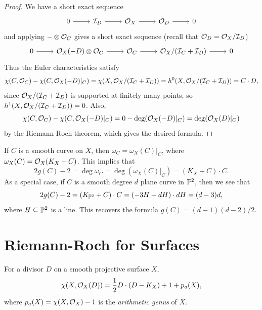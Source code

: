 \begin{proof}
  We have a short exact sequence
  \[
    \begin{tikzcd}
      0 \ar[r] & \mathcal{I}_D
      \ar[r] & \OO_X
      \ar[r] & \OO_D
      \ar[r] & 0
    \end{tikzcd}
  \]
  and applying $- \otimes \mathcal{O}_C$ gives a
  short exact sequence
  (recall that $\mathcal{O}_D = \mathcal{O}_X / \mathcal{I}_D$)
  \[
    \begin{tikzcd}
      0 \ar[r] &
      \OO_X(-D) \otimes \OO_C
      \ar[r] & \OO_C
      \ar[r] & \OO_X / (\mathcal{I}_C + \mathcal{I}_D)
      \ar[r] & 0
    \end{tikzcd}
  \]
  Thus the Euler characteristics satisfy
  \[
    \chi(C, \mathcal{O}_C)
    - \chi(C, \mathcal{O}_X(-D)|_C)
    = \chi(X, \mathcal{O}_X / (\mathcal{I}_C + \mathcal{I}_D))
    = h^0(X, \mathcal{O}_X / (\mathcal{I}_C + \mathcal{I}_D))
    = C \cdot D,
  \]
  since $\mathcal{O}_X / (\mathcal{I}_C + \mathcal{I}_D)$ is supported at finitely many points,
  so $h^1(X, \mathcal{O}_X / (\mathcal{I}_C + \mathcal{I}_D)) = 0$.
  Also,
  \[
    \chi(C, \mathcal{O}_C)
    - \chi(C, \mathcal{O}_X(-D)|_C)
    = 0 - \deg(\mathcal{O}_X(-D)|_C)
    = \deg(\mathcal{O}_X(D)|_C)
  \]
  by the Riemann-Roch theorem, which
  gives the desired formula.
\end{proof}

\begin{example}
  If $C$ is a smooth curve on $X$, then
  $\omega_C
    = \omega_X(C)|_C$, where
  $\omega_X(C) = \mathcal{O}_X(K_X + C)$.
  This implies that
  \[
    2 g(C) - 2
    = \deg \omega_C
    = \deg(\omega_X(C)|_C)
    = (K_X + C) \cdot C.
  \]
  As a special case, if $C$ is a smooth
  degree $d$ plane curve in $\mathbb{P}^2$, then
  we see that
  \[
    2g(C) - 2
    = (K_{\mathbb{P}^2} + C) \cdot C
    = (-3H + d H) \cdot dH
    = (d - 3)d,
  \]
  where $H \subseteq \mathbb{P}^2$ is a line.
  This recovers the formula
  $g(C) = (d - 1)(d - 2) / 2$.
\end{example}

\section{Riemann-Roch for Surfaces}

\begin{theorem}\label{thm:RR-surfaces}
  For a divisor $D$ on a smooth
  projective surface $X$,
  \[
    \chi(X, \mathcal{O}_X(D))
    = \frac{1}{2} D \cdot (D - K_X)
    + 1 + p_a(X),
  \]
  where $p_a(X) = \chi(X, \mathcal{O}_X) - 1$
  is the \emph{arithmetic genus} of $X$.
\end{theorem}

